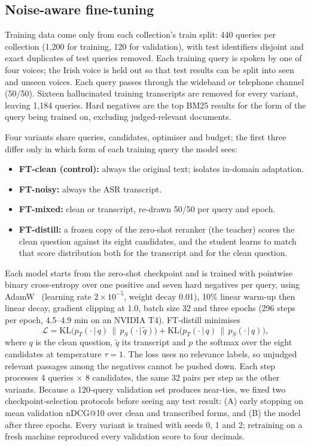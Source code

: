 \documentclass[conference]{IEEEtran}
\begin{document}
\subsection{Noise-aware fine-tuning}
Training data come only from each collection's train split: 440 queries per collection (1,200 for training, 120 for validation), with test identifiers disjoint and exact duplicates of test queries removed. Each training query is spoken by one of four voices; the Irish voice is held out so that test results can be split into seen and unseen voices. Each query passes through the wideband or telephone channel (50/50). Sixteen hallucinated training transcripts are removed for every variant, leaving 1,184 queries. Hard negatives are the top BM25 results for the form of the query being trained on, excluding judged-relevant documents.

Four variants share queries, candidates, optimiser and budget; the first three differ only in which form of each training query the model sees:
\begin{itemize}
\item \textbf{FT-clean (control):} always the original text; isolates in-domain adaptation.
\item \textbf{FT-noisy:} always the ASR transcript.
\item \textbf{FT-mixed:} clean or transcript, re-drawn 50/50 per query and epoch.
\item \textbf{FT-distill:} a frozen copy of the zero-shot reranker (the teacher) scores the clean question against its eight candidates, and the student learns to match that score distribution both for the transcript and for the clean question.
\end{itemize}
Each model starts from the zero-shot checkpoint and is trained with pointwise binary cross-entropy over one positive and seven hard negatives per query, using AdamW~\cite{adamw} (learning rate $2\times10^{-5}$, weight decay 0.01), 10\% linear warm-up then linear decay, gradient clipping at 1.0, batch size 32 and three epochs (296 steps per epoch, 4.5--4.9 min on an NVIDIA T4). FT-distill minimises
\begin{equation}
\mathcal{L} = \mathrm{KL}\big(p_T(\cdot\,|\,q)\,\|\,p_S(\cdot\,|\,\tilde q)\big) + \mathrm{KL}\big(p_T(\cdot\,|\,q)\,\|\,p_S(\cdot\,|\,q)\big),
\end{equation}
where $q$ is the clean question, $\tilde q$ its transcript and $p$ the softmax over the eight candidates at temperature $\tau=1$. The loss uses no relevance labels, so unjudged relevant passages among the negatives cannot be pushed down. Each step processes 4 queries $\times$ 8 candidates, the same 32 pairs per step as the other variants. Because a 120-query validation set produces near-ties, we fixed two checkpoint-selection protocols before seeing any test result: (A) early stopping on mean validation nDCG@10 over clean and transcribed forms, and (B) the model after three epochs. Every variant is trained with seeds 0, 1 and 2; retraining on a fresh machine reproduced every validation score to four decimals.
\end{document}
